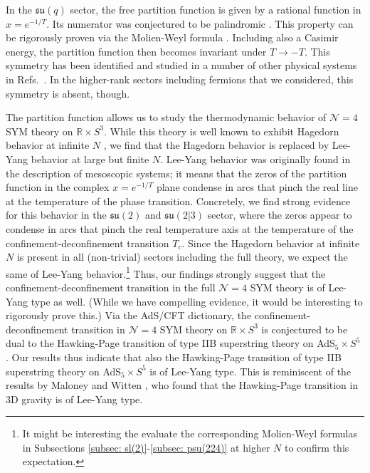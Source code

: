 \documentclass[a4paper,11pt]{article}
\begin{document}
In the $\mathfrak{su}(q)$ sector, the free partition function is given by a rational function in $x=e^{-1/T}$. Its numerator was conjectured to be palindromic \cite{Harmark:2014mpa}. This property can be rigorously proven via the Molien-Weyl formula \cite{teranishi1986}. Including also a Casimir energy, the partition function then becomes invariant under $T\to-T$. This symmetry has been identified and studied in a number of other physical systems in Refs.\ \cite{Basar:2014mha,McGady:2017rzv,McGady:2018rmo}.
In the higher-rank sectors including fermions that we considered, this symmetry is absent, though.

The partition function allows us to study the thermodynamic behavior of $\mathcal{N}=4$ SYM theory on $\mathbb{R}\times S^3$.
While this theory is well known to exhibit Hagedorn behavior at infinite $N$ \cite{Sundborg:1999ue}, we find that the Hagedorn behavior is replaced by Lee-Yang behavior at large but finite $N$.
Lee-Yang behavior \cite{Yang:1952be} was originally found in the description of mesoscopic systems; it means that the zeros of the partition function in the complex $x=e^{-1/T}$ plane condense in arcs that pinch the real line at the temperature of the phase transition.
Concretely, we find strong evidence for this behavior in the $\mathfrak{su}(2)$ and $\mathfrak{su}(2|3)$ sector, where the zeros appear to condense in arcs that pinch the real temperature axis at the temperature of the confinement-deconfinement transition $T_c$. 
Since the Hagedorn behavior at infinite $N$ is present in all (non-trivial) sectors including the full theory, we expect the same of Lee-Yang behavior.\footnote{It might be interesting the evaluate the corresponding Molien-Weyl formulas in Subsections \ref{subsec: sl(2)}-\ref{subsec: psu(224)} at higher $N$ to confirm this expectation.}
Thus, our findings strongly suggest that the confinement-deconfinement transition in the full $\mathcal{N}=4$ SYM theory is of Lee-Yang type as well. (While we have compelling evidence, it would be interesting to rigorously prove this.)
%
Via the AdS/CFT dictionary, the confinement-deconfinement transition in $\mathcal{N}=4$ SYM theory on $\mathbb{R}\times S^3$ is conjectured to be dual to the Hawking-Page transition of type IIB superstring theory on AdS${}_5\times S^5$ \cite{Witten:1998zw}. Our results thus indicate that also the Hawking-Page transition  of type IIB superstring theory on AdS${}_5\times S^5$ is of Lee-Yang type.
This is reminiscent of the results by Maloney and Witten \cite{Maloney:2007ud}, who found that the Hawking-Page transition in 3D gravity is of Lee-Yang type.
\end{document}
